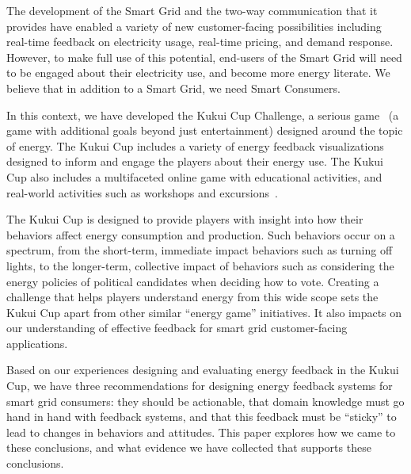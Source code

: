 \documentclass[10pt, conference, compsocconf]{IEEEtran}
\begin{document}
The development of the Smart Grid and the two-way communication that it provides have enabled a variety of new customer-facing possibilities including real-time feedback on electricity usage, real-time pricing, and demand response. However, to make full use of this potential, end-users of the Smart Grid will need to be engaged about their electricity use, and become more energy literate. We believe that in addition to a Smart Grid, we need Smart Consumers.

In this context, we have developed the Kukui Cup Challenge, a serious game~\cite{Zyda2005} (a game with additional goals beyond just entertainment) designed around the topic of energy. The Kukui Cup includes a variety of energy feedback visualizations~\cite{Froehlich2010} designed to inform and engage the players about their energy use. The Kukui Cup also includes a multifaceted online game with educational activities, and real-world activities such as workshops and excursions~\cite{csdl2-10-07}.

The Kukui Cup is designed to provide players with insight into how their behaviors affect energy consumption and production. Such behaviors occur on a spectrum, from the short-term, immediate impact behaviors such as turning off lights, to the longer-term, collective impact of behaviors such as considering the energy policies of political candidates when deciding how to vote. Creating a challenge that helps players understand energy from this wide scope sets the Kukui Cup apart from other similar ``energy game'' initiatives. It also impacts on our understanding of effective feedback for smart grid customer-facing applications.


Based on our experiences designing and evaluating energy feedback in the Kukui Cup, we have three recommendations for designing energy feedback systems for smart grid consumers: they should be actionable, that domain knowledge must go hand in hand with feedback systems, and that this feedback must be ``sticky'' to lead to changes in behaviors and attitudes. This paper explores how we came to these conclusions, and what evidence we have collected that supports these conclusions.
\end{document}
